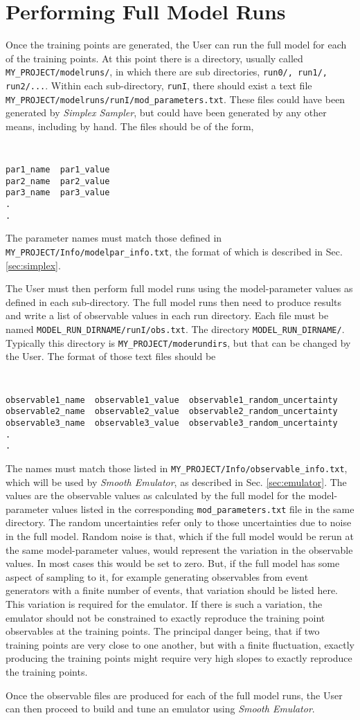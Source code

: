 \documentclass[UserManual.tex]{subfiles}
\begin{document}
\setcounter{section}{3}
\section{Performing Full Model Runs}\label{sec:fullmodel}

Once the training points are generated, the User can run the full model for each of the training points. At this point there is a directory, usually called {\tt MY\_PROJECT/modelruns/}, in which there are sub directories, {\tt run0/, run1/, run2/...}.  Within each sub-directory, {\tt runI}, there should exist a text file {\tt MY\_PROJECT/modelruns/runI/mod\_parameters.txt}. These files could have been generated by {\it Simplex Sampler}, but could have been generated by any other means, including by hand. The files should be of the form,
{\tt
\begin{verbatim}
par1_name  par1_value
par2_name  par2_value
par3_name  par3_value
.
.
\end{verbatim}
}
The parameter names must match those defined in {\tt MY\_PROJECT/Info/modelpar\_info.txt}, the format of which is described in Sec. \ref{sec:simplex}. 

The User must then perform full model runs using the model-parameter values as defined in each sub-directory. The full model runs then need to produce results and write a list of observable values in each run directory. Each file must be named {\tt MODEL\_RUN\_DIRNAME/runI/obs.txt}. The directory {\tt MODEL\_RUN\_DIRNAME/}. Typically this directory is {\tt MY\_PROJECT/moderundirs}, but that can be changed by the User. The format of those text files should be
{\tt
\begin{verbatim}
observable1_name  observable1_value  observable1_random_uncertainty
observable2_name  observable2_value  observable2_random_uncertainty
observable3_name  observable3_value  observable3_random_uncertainty
.
.
\end{verbatim}
}
The names must match those listed in {\tt MY\_PROJECT/Info/observable\_info.txt}, which will be used by {\it Smooth Emulator}, as described in Sec. \ref{sec:emulator}. The values are the observable values as calculated by the full model for the model-parameter values listed in the corresponding {\tt mod\_parameters.txt} file in the same directory. The random uncertainties refer only to those uncertainties due to noise in the full model. Random noise is that, which if the full model would be rerun at the same model-parameter values, would represent the variation in the observable values. In most cases this would be set to zero. But, if the full model has some aspect of sampling to it, for example generating observables from event generators with a finite number of events, that variation should be listed here. This variation is required for the emulator. If there is such a variation, the emulator should not be constrained to exactly reproduce the training point observables at the training points. The principal danger being, that if two training points are very close to one another, but with a finite fluctuation, exactly producing the training points might require very high slopes to exactly reproduce the training points.

Once the observable files are produced for each of the full model runs, the User can then proceed to build and tune an emulator using {\it Smooth Emulator}.
\end{document}
